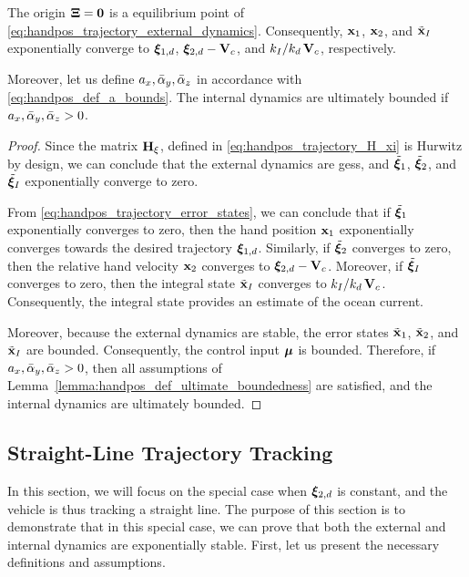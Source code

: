\begin{prop}
    \label{prop:handpos_trajectory_trajectory_tracking}
    The origin $\bm{\Xi} = \mathbf{0}$ is a  equilibrium point of \eqref{eq:handpos_trajectory_external_dynamics}.
    Consequently, $\mathbf{x}_1$, $\mathbf{x}_2$, and $\tilde{\mathbf{x}}_I$ exponentially converge to $\bm{\xi}_{1, d}$, $\bm{\xi}_{2, d} - \mathbf{V}_c$, and $k_I/k_d\,\mathbf{V}_c$, respectively.

    Moreover, let us define $a_x, \Bar{\alpha}_y, \Bar{\alpha}_z$ in accordance with \eqref{eq:handpos_def_a_bounds}.
    The internal dynamics are ultimately bounded if $a_x, \Bar{\alpha}_y, \Bar{\alpha}_z > 0$.
\end{prop}
\begin{proof}
    Since the matrix $\mathbf{H}_{\xi}$, defined in \eqref{eq:handpos_trajectory_H_xi} is Hurwitz by design, we can conclude that the external dynamics are \glspl{ges}, and $\tilde{\bm{\xi}}_1$, $\tilde{\bm{\xi}}_2$, and $\tilde{\bm{\xi}}_I$ exponentially converge to zero.

    From \eqref{eq:handpos_trajectory_error_states}, we can conclude that if $\tilde{\bm{\xi}}_1$ exponentially converges to zero, then the hand position $\mathbf{x}_1$ exponentially converges towards the desired trajectory $\bm{\xi}_{1, d}$.
    Similarly, if $\tilde{\bm{\xi}}_2$ converges to zero, then the relative hand velocity $\mathbf{x}_2$ converges to $\bm{\xi}_{2, d} - \mathbf{V}_c$.
    Moreover, if $\tilde{\bm{\xi}}_I$ converges to zero, then the integral state $\tilde{\mathbf{x}}_I$ converges to $k_I/k_d\,\mathbf{V}_c$.
    Consequently, the integral state provides an estimate of the ocean current.

    Moreover, because the external dynamics are stable, the error states $\tilde{\mathbf{x}}_1$, $\tilde{\mathbf{x}}_2$, and $\tilde{\mathbf{x}}_I$ are bounded.
    Consequently, the control input $\bm{\mu}$ is bounded.
    Therefore, if $a_x, \Bar{\alpha}_y, \Bar{\alpha}_z > 0$, then all assumptions of Lemma~\ref{lemma:handpos_def_ultimate_boundedness} are satisfied, and the internal dynamics are ultimately bounded.
\end{proof}

\subsection{Straight-Line Trajectory Tracking}
\label{sec:handpos_trajectory_straight_line_trajectory}
In this section, we will focus on the special case when $\bm{\xi}_{2, d}$ is constant, and the vehicle is thus tracking a straight line.
The purpose of this section is to demonstrate that in this special case, we can prove that both the external and internal dynamics are exponentially stable.
First, let us present the necessary definitions and assumptions.

